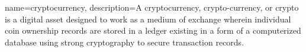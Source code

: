 \makeglossaries
 
{
    name=cryptocurrency,
    description={A cryptocurrency, crypto-currency, or crypto is a digital asset designed to work as a medium of exchange wherein individual coin ownership records are stored in a ledger existing in a form of a computerized database using strong cryptography to secure transaction records.}
}